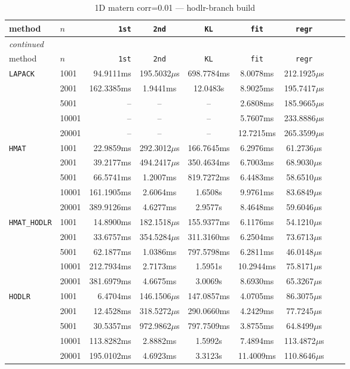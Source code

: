 \documentclass[11pt,a4paper]{article}
\begin{document}
\begin{center}
\begin{longtable}{llrcccccc}
\caption{1D matern corr=0.01 --- hodlr-branch build}
\\\toprule
method & $n$ & \texttt{1st} & \texttt{2nd} & \texttt{KL} & \texttt{fit} & \texttt{regr}\\
\midrule
\endfirsthead
\multicolumn{8}{l}{\small\emph{continued}}\\
\toprule
method & $n$ & \texttt{1st} & \texttt{2nd} & \texttt{KL} & \texttt{fit} & \texttt{regr}\\
\midrule
\endhead

\texttt{LAPACK} & 1001 & 94.9111ms & 195.5032$\mu$s & 698.7784ms & 8.0078ms & 212.1925$\mu$s\\
 & 2001 & 162.3385ms & 1.9441ms & 12.0483s & 8.9025ms & 195.7417$\mu$s\\
 & 5001 & -- & -- & -- & 2.6808ms & 185.9665$\mu$s\\
 & 10001 & -- & -- & -- & 5.7607ms & 233.8886$\mu$s\\
 & 20001 & -- & -- & -- & 12.7215ms & 265.3599$\mu$s\\
\texttt{HMAT} & 1001 & 22.9859ms & 292.3012$\mu$s & 166.7645ms & 6.2976ms & 61.2736$\mu$s\\
 & 2001 & 39.2177ms & 494.2417$\mu$s & 350.4634ms & 6.7003ms & 68.9030$\mu$s\\
 & 5001 & 66.5741ms & 1.2007ms & 819.7272ms & 6.4483ms & 58.6510$\mu$s\\
 & 10001 & 161.1905ms & 2.6064ms & 1.6508s & 9.9761ms & 83.6849$\mu$s\\
 & 20001 & 389.9126ms & 4.6277ms & 2.9577s & 8.4648ms & 59.6046$\mu$s\\
\texttt{HMAT\_HODLR} & 1001 & 14.8900ms & 182.1518$\mu$s & 155.9377ms & 6.1176ms & 54.1210$\mu$s\\
 & 2001 & 33.6757ms & 354.5284$\mu$s & 311.3160ms & 6.2504ms & 73.6713$\mu$s\\
 & 5001 & 62.1877ms & 1.0386ms & 797.5798ms & 6.2811ms & 46.0148$\mu$s\\
 & 10001 & 212.7934ms & 2.7173ms & 1.5951s & 10.2944ms & 75.8171$\mu$s\\
 & 20001 & 381.6979ms & 4.6675ms & 3.0069s & 8.6930ms & 65.3267$\mu$s\\
\texttt{HODLR} & 1001 & 6.4704ms & 146.1506$\mu$s & 147.0857ms & 4.0705ms & 86.3075$\mu$s\\
 & 2001 & 12.4528ms & 318.5272$\mu$s & 290.0660ms & 4.2429ms & 77.7245$\mu$s\\
 & 5001 & 30.5357ms & 972.9862$\mu$s & 797.7509ms & 3.8755ms & 64.8499$\mu$s\\
 & 10001 & 113.8282ms & 2.8882ms & 1.5992s & 7.4894ms & 113.4872$\mu$s\\
 & 20001 & 195.0102ms & 4.6923ms & 3.3123s & 11.4009ms & 110.8646$\mu$s\\
\bottomrule\end{longtable}\end{center}
\end{document}
